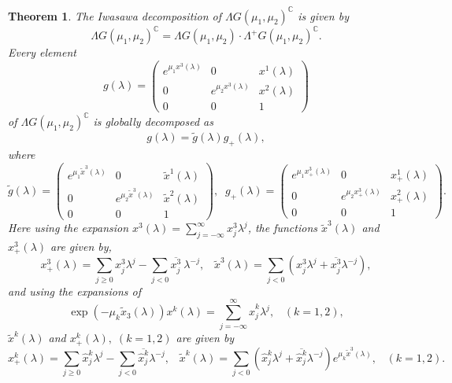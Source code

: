 \documentclass[12pt]{amsart}
\newtheorem{Theorem}{Theorem}[section]
\theoremstyle{definition}
\theoremstyle{remark}
\numberwithin{equation}{section}
\begin{document}
\begin{Theorem}\label{thm:Iwasawa-sol}
 The Iwasawa decomposition of $\Lambda G(\mu_1,\mu_2)^{\mathbb{C}}$ is 
 given by 
\begin{equation*}
\Lambda G(\mu_1,\mu_2)^{\mathbb{C}}
=
\Lambda G(\mu_1,\mu_2)\cdot
\Lambda^{+} G(\mu_1,\mu_2)^{\mathbb{C}}.
\end{equation*}
 Every element
\begin{equation*}
 g({\lambda}) = 
 \begin{pmatrix}
 e^{\mu_1 x^3({\lambda})} & 0 & x^1({\lambda})  \\
 0 & e^{\mu_2 x^3({\lambda})}  & x^2({\lambda})  \\
 0 & 0 & 1
 \end{pmatrix}
\end{equation*}
 of $\Lambda G(\mu_1,\mu_2)^{\mathbb{C}}$ is globally decomposed as
\begin{equation*}
 g({\lambda})= \tilde g({\lambda})g_{+}({\lambda}),
\end{equation*}
 where 
\begin{equation*}
 \tilde g({\lambda}) =
 \begin{pmatrix}
 e^{\mu_1 \tilde x^3({\lambda})} & 0 & \tilde x^1({\lambda})  \\
 0 & e^{\mu_2 \tilde x^3({\lambda})}  & \tilde x^2({\lambda})  \\
 0 & 0 & 1
 \end{pmatrix}, \;\;
 g_+ ({\lambda}) =
 \begin{pmatrix}
 e^{\mu_1 x_+^3({\lambda})} & 0 & x_+^1({\lambda})  \\
 0 & e^{\mu_2 x_+^3({\lambda})}  & x_+^2({\lambda})  \\
 0 & 0 & 1
 \end{pmatrix}.
\end{equation*}
 Here using the expansion $x^3({\lambda}) = \sum_{j=-\infty}^{\infty} x_j^3 {\lambda}^j$, 
 the functions $\tilde x^3({\lambda})$ and $x^3_+({\lambda})$ are given by,
\begin{equation*}
x^{3}_{+}({\lambda})
=\sum_{j\geq 0}x^{3}_j{\lambda}^j
-\sum_{j<0}\overline{x^{3}_j}\>{\lambda}^{-j}, \;\;\;
 \tilde x^{3}({\lambda})=\sum_{j<0} \left(x^3_j {\lambda}^j +\overline{x^3_j} {\lambda}^{-j}\right),
\end{equation*}
 and using the expansions of 
\begin{equation*}
 \exp\left(- \mu_k \tilde x_3({\lambda})\right) x^k({\lambda}) 
 =  \sum_{j=-\infty}^{\infty} \hat x_j^k {\lambda}^j,
 \;\;\;(k =1, 2), 
\end{equation*}
 $\tilde x^k({\lambda})$ and $x^k_+({\lambda}),\;(k =1, 2)$ are given by
\begin{equation*}
 x^{k}_{+}({\lambda})=\sum_{j\geq  0} \hat x^k_j{\lambda}^j-\sum_{j<0}\overline{\hat x^k_j}{\lambda}^{-j},
 \;\;\;
 \tilde x^{k}({\lambda})=\sum_{j< 0} \left(\hat x^k_j {\lambda}^j+\overline{\hat x^k_j}{\lambda}^{-j}\right)
 e^{\mu_k \tilde x^3({\lambda})}, 
 \;\;\;(k =1, 2).
\end{equation*}
\end{Theorem} 
\end{document}
